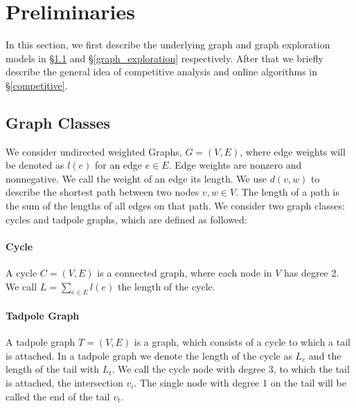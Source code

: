 \section{Preliminaries} \label{preliminaries}

In this section, we first describe the underlying graph and graph exploration models in \S\ref{graph_classes} and \S\ref{graph_exploration} respectively.
After that we briefly describe the general idea of competitive analysis and online algorithms in \S\ref{competitive}.

\subsection{Graph Classes}\label{graph_classes}

We consider undirected weighted Graphs, $G=(V,E)$, where edge weights
will be denoted as $l(e)$ for an edge $e\in E$. Edge weights are nonzero
and nonnegative. We call the weight of an edge its length. We use
$d(v,w)$ to describe the shortest path between two nodes $v,w \in V$. The length
of a path is the sum of the lengths of all edges on that path. We consider
two graph classes: cycles and tadpole graphs, which are defined as followed:

\paragraph*{Cycle} A cycle $C=(V,E)$ is a connected graph, where each node in $V$ has degree 2.
We call $L = \sum_{e \in E}^{}l(e)$ the length of the cycle.

\paragraph*{Tadpole Graph} A tadpole graph $T=(V,E)$ is a graph, which consists of a cycle to which
a tail is attached. In a tadpole graph we denote the length of the cycle as $L_c$ and the length
of the tail with $L_t$. We call the cycle node with degree 3, to which the tail is attached, the intersection $v_i$.
The single node with degree 1 on the tail will be called the end of the tail $v_t$.

